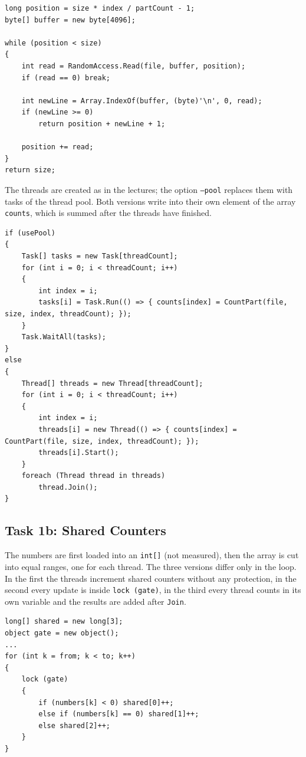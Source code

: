 \documentclass[12pt,a4paper]{article}
\begin{document}
\begin{lstlisting}[style=csharp,caption={Start of a part (Task1a.cs)}]
long position = size * index / partCount - 1;
byte[] buffer = new byte[4096];

while (position < size)
{
    int read = RandomAccess.Read(file, buffer, position);
    if (read == 0) break;

    int newLine = Array.IndexOf(buffer, (byte)'\n', 0, read);
    if (newLine >= 0)
        return position + newLine + 1;

    position += read;
}
return size;
\end{lstlisting}

The threads are created as in the lectures; the option \texttt{--pool} replaces them with tasks of the thread pool. Both versions write into their own element of the array \texttt{counts}, which is summed after the threads have finished.

\begin{lstlisting}[style=csharp,caption={Own threads and thread pool in Task1a.cs}]
if (usePool)
{
    Task[] tasks = new Task[threadCount];
    for (int i = 0; i < threadCount; i++)
    {
        int index = i;
        tasks[i] = Task.Run(() => { counts[index] = CountPart(file, size, index, threadCount); });
    }
    Task.WaitAll(tasks);
}
else
{
    Thread[] threads = new Thread[threadCount];
    for (int i = 0; i < threadCount; i++)
    {
        int index = i;
        threads[i] = new Thread(() => { counts[index] = CountPart(file, size, index, threadCount); });
        threads[i].Start();
    }
    foreach (Thread thread in threads)
        thread.Join();
}
\end{lstlisting}

\subsection{Task 1b: Shared Counters}

The numbers are first loaded into an \texttt{int[]} (not measured), then the array is cut into equal ranges, one for each thread. The three versions differ only in the loop. In the first the threads increment shared counters without any protection, in the second every update is inside \texttt{lock (gate)}, in the third every thread counts in its own variable and the results are added after \texttt{Join}.

\begin{lstlisting}[style=csharp,caption={Version 2, shared counters under a lock (Task1b.cs)}]
long[] shared = new long[3];
object gate = new object();
...
for (int k = from; k < to; k++)
{
    lock (gate)
    {
        if (numbers[k] < 0) shared[0]++;
        else if (numbers[k] == 0) shared[1]++;
        else shared[2]++;
    }
}
\end{lstlisting}
\end{document}
